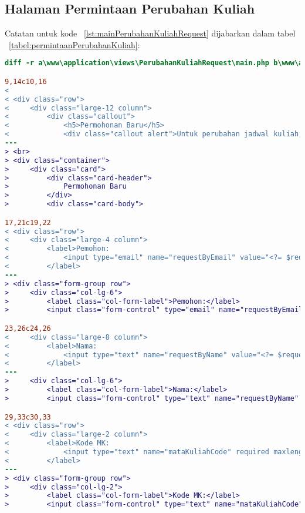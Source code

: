 \subsection{Halaman Permintaan Perubahan Kuliah}
\noindent Catatan untuk kode ~\ref{lst:mainPerubahanKuliahRequest} dijabarkan dalam tabel ~\ref{tabel:permintaanPerubahanKuliah}:

\begin{lstlisting}[language=diff, caption=Perubahan file \path{\views\PerubahanKuliahRequest\main.php} ,  basicstyle=\ttfamily, frame=single,
columns=fullflexible, keepspaces=true, breaklines=true, label={lst:mainPerubahanKuliahRequest}]
diff -r a\www\application\views\PerubahanKuliahRequest\main.php b\www\application\views\PerubahanKuliahRequest\main.php

9,14c10,16
< 
< <div class="row">
<     <div class="large-12 column">
<         <div class="callout">
<             <h5>Permohonan Baru</h5>
<             <div class="callout alert">Untuk perubahan jadwal kuliah, silakan berkoordinasi langsung dengan peserta kuliah.</div>                    
---
> <br>
> <div class="container">
>     <div class="card">
>         <div class="card-header">
>             Permohonan Baru
>         </div>
>         <div class="card-body">

17,21c19,22
< <div class="row">
<     <div class="large-4 column">
<         <label>Pemohon:
<             <input type="email" name="requestByEmail" value="<?= $requestByEmail ?>" readonly="readonly"/>
<         </label>
---
> <div class="form-group row">
>     <div class="col-lg-6">
>         <label class="col-form-label">Pemohon:</label>
>         <input class="form-control" type="email" name="requestByEmail" value="<?= $requestByEmail ?>" readonly/>

23,26c24,26
<     <div class="large-8 column">
<         <label>Nama:
<             <input type="text" name="requestByName" value="<?= $requestByName ?>" readonly="readonly"/>
<         </label>
---
>     <div class="col-lg-6">
>         <label class="col-form-label">Nama:</label>
>         <input class="form-control" type="text" name="requestByName" value="<?= $requestByName ?>" readonly="readonly"/>

29,33c30,33
< <div class="row">
<     <div class="large-2 column">
<         <label>Kode MK:
<             <input type="text" name="mataKuliahCode" required maxlength="9" pattern="[A-Z]{3}[0-9]{3}([0-9]{3})?" title="Kode MK dalam format XYZ123"/>
<         </label>
---
> <div class="form-group row">
>     <div class="col-lg-2">
>         <label class="col-form-label">Kode MK:</label>
>         <input class="form-control" type="text" name="mataKuliahCode" required maxlength="9" pattern="[A-Z]{3}[0-9]{3}([0-9]{3})?" title="Kode MK dalam format XYZ123"/>


\end{lstlisting}
